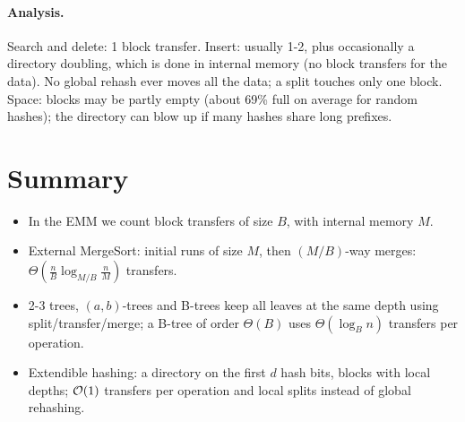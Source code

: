\paragraph{Analysis.} Search and delete: 1 block transfer. Insert: usually 1-2,
plus occasionally a directory doubling, which is done in internal memory (no
block transfers for the data). No global rehash ever moves all the data; a split
touches only one block. Space: blocks may be partly empty (about 69\% full on
average for random hashes); the directory can blow up if many hashes share long
prefixes.

\section{Summary}
\begin{itemize}
  \item In the EMM we count block transfers of size $B$, with internal memory $M$.
  \item External MergeSort: initial runs of size $M$, then $(M/B)$-way merges:
        $\Theta(\frac nB \log_{M/B} \frac nM)$ transfers.
  \item 2-3 trees, $(a,b)$-trees and B-trees keep all leaves at the same depth
        using split/transfer/merge; a B-tree of order $\Theta(B)$ uses
        $\Theta(\log_B n)$ transfers per operation.
  \item Extendible hashing: a directory on the first $d$ hash bits, blocks with
        local depths; $\mathcal{O}(1)$ transfers per operation and local splits instead
        of global rehashing.
\end{itemize}
